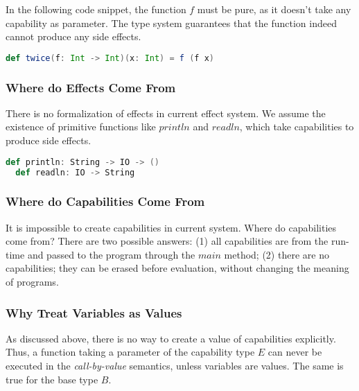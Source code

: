 In the following code snippet, the function $f$ must be pure, as it
doesn't take any capability as parameter. The type system guarantees
that the function indeed cannot produce any side effects.

\begin{lstlisting}[language=Scala]
  def twice(f: Int -> Int)(x: Int) = f (f x)
\end{lstlisting}


\subsubsection{Where do Effects Come From}

There is no formalization of effects in current effect system. We
assume the existence of primitive functions like $println$ and
$readln$, which take capabilities to produce side effects.

\begin{lstlisting}[language=Scala]
  def println: String -> IO -> ()
  def readln: IO -> String
\end{lstlisting}



\subsubsection{Where do Capabilities Come From}

It is impossible to create capabilities in current system. Where do
capabilities come from?  There are two possible answers: (1) all
capabilities are from the run-time and passed to the program through
the $main$ method; (2) there are no capabilities; they can be erased
before evaluation, without changing the meaning of programs.


\subsubsection{Why Treat Variables as Values}

As discussed above, there is no way to create a value of capabilities
explicitly. Thus, a function taking a parameter of the capability type
$E$ can never be executed in the \emph{call-by-value} semantics,
unless variables are values. The same is true for the base type $B$.

